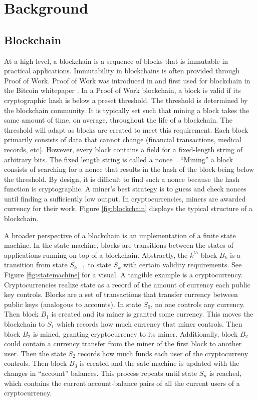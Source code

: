 \section{Background}
\label{sec:background}

\subsection{Blockchain}

At a high level, a blockchain is a sequence of blocks that is immutable in practical applications.
Immutability in blockchains is often provided through Proof of Work.
Proof of Work was introduced in \cite{dwork1992PoW} and first used for blockchain in the Bitcoin whitepaper \cite{nakamoto2009Bitcoin}.
In a Proof of Work blockchain, a block is valid if its cryptographic hash is below a preset threshold.
The threshold is determined by the blockchain community.
It is typically set such that mining a block takes the same amount of time, on average, throughout the life of a blockchain.
The threshold will adapt as blocks are created to meet this requirement.
Each block primarily consists of data that cannot change (financial transactions, medical records, etc).
However, every block contains a field for a fixed-length string of arbitrary bits.
The fixed length string is called a nonce~\cite{nakamoto2009Bitcoin}.
``Mining'' a block consists of searching for a nonce that results in the hash of the block being below the threshold.
By design, it is difficult to find such a nonce because the hash function is cryptographic.
A miner's best strategy is to guess and check nonces until finding a sufficiently low output.
In cryptocurrencies, miners are awarded currency for their work.
Figure \ref{fig:blockchain} displays the typical structure of a blockchain.



A broader perspective of a blockchain is an implementation of a finite state machine.
In the state machine, blocks are transitions between the states of applications running on top of a blockchain.
Abstractly, the $k^{th}$ block $B_k$ is a transition from state $S_{k-1}$ to state $S_k$ with certain validity requirements.
See Figure \ref{fig:statemachine} for a visual.
A tangible example is a cryptocurrency.
Cryptocurrencies realize state as a record of the amount of currency each public key controls.
Blocks are a set of transactions that transfer currency between public keys (analogous to accounts).
In state $S_0$, no one controls any currency.
Then block $B_1$ is created and its miner is granted some currency.
This moves the blockchain to $S_1$ which records how much currency that miner controls.
Then block $B_2$ is mined, granting cryptocurrency to its miner.
Additionally, block $B_2$ could contain a currency transfer from the miner of the first block to another user.
Then the state $S_2$ records how much funds each user of the cryptocurreny controls.
Then block $B_3$ is created and the sate machine is updated with the changes in ``account'' balances.
This process repeats until state $S_n$ is reached, which contains the current account-balance pairs of all the current users of a cryptocurrency.

